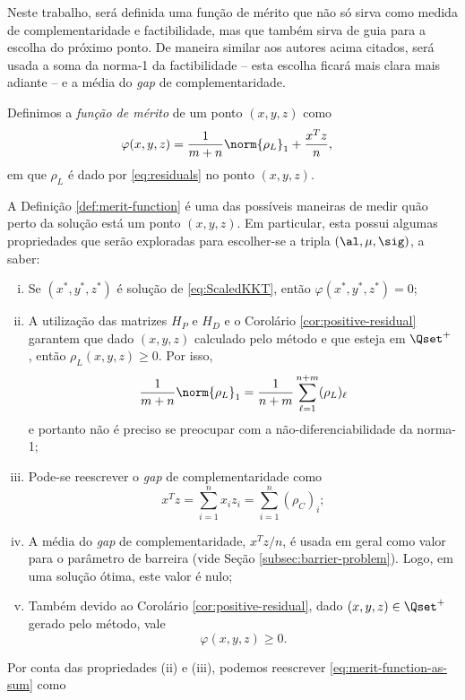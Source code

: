 
Neste trabalho, será definida uma função de mérito que não só sirva como medida
de complementaridade e factibilidade, mas que também sirva de guia para a
escolha do próximo ponto. De maneira similar aos autores acima citados, será
usada a soma da norma-1  da factibilidade -- esta escolha ficará mais clara
mais adiante --  e a média do \emph{gap} de complementaridade. 

\begin{defin}
\label{def:merit-function}
Definimos a \emph{função de mérito} de um ponto  $(x,y,z)$ como
\begin{align}
\varphi(x,y,z) & = \frac{1}{m+n}\norm{\rho_L}_1+ 
\frac{x^Tz}{n}, \label{eq:merit-function-as-sum}
\end{align}
em que $\rho_L$ é dado por  \eqref{eq:residuals} no ponto
$(x,y,z)$.

\end{defin}

A Definição \ref{def:merit-function} é uma das possíveis maneiras de medir quão
perto da solução está um ponto $(x,y,z)$. Em particular,  esta possui algumas
propriedades que serão exploradas para escolher-se a tripla $(\al,\mu,\sig)$, a
saber:

\begin{enumerate}[(i)] 
	\item Se $(x^*,y^*,z^*)$ é solução de
\eqref{eq:ScaledKKT}, então $\varphi(x^*,y^*,z^*)=0$;
	
\item A utilização das matrizes $H_P$ e $H_D$  e o Corolário
\ref{cor:positive-residual} garantem que dado $(x,y,z)$ calculado pelo
método e que esteja em $\Qset^+$ , então $\rho_L(x,y,z)\geq 0$. Por isso,
\[\frac{1}{m+n}\norm{\rho_L}_1 = \frac{1}{n+m}\sum_{\ell=1}^{n+m}(\rho_L)_\ell \] e portanto não é preciso se
preocupar com a não-diferenciabilidade da norma-1; 



\item  Pode-se reescrever o
\emph{gap} de complementaridade como
 \[x^Tz = \sum_{i=1}^{n}x_iz_i = \sum_{i=1}^{n}(\rho_C)_i;\]

\item A média do \emph{gap} de complementaridade, $x^Tz/n$, é usada em geral
como valor para o parâmetro de barreira (vide Seção
\ref{subsec:barrier-problem}). Logo, em uma solução ótima, este valor é
nulo;    
\item Também devido ao Corolário \ref{cor:positive-residual}, dado
$(x,y,z)\in\Qset^+$ gerado pelo método, vale
\[
\varphi(x,y,z)\geq0.
\]
\end{enumerate}
Por conta das propriedades (ii) e (iii), podemos reescrever
\eqref{eq:merit-function-as-sum} como


